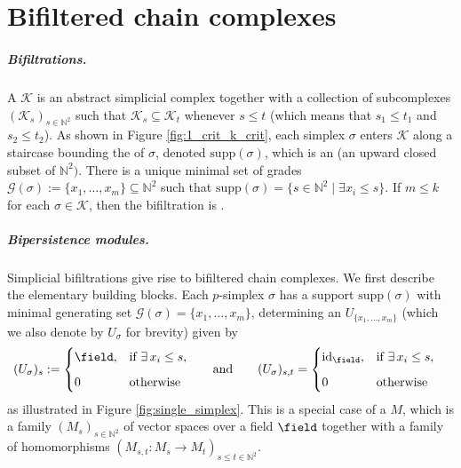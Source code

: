 \section{Bifiltered chain complexes}
\label{sec:Background}
%
\subparagraph{Bifiltrations.} A  $\mathcal{K}$ is an abstract simplicial complex together with a collection of subcomplexes $(\mathcal{K}_s)_{s\in \mathbb{N}^2}$ such that $\mathcal{K}_s\subseteq \mathcal{K}_t$ whenever $s\leq t$ (which means that $s_1\leq t_1$ and $s_2\leq t_2$).
As shown in Figure \ref{fig:1_crit_k_crit}, each simplex $\sigma$ enters $\mathcal{K}$ along a staircase bounding the  of $\sigma$, denoted $\mathrm{supp}(\sigma)$, which is an  (an upward closed subset of $\mathbb{N}^2)$.
There is a unique minimal set of grades
$\mathcal{G}(\sigma):=\{x_1,\dots,x_m\}\subseteq \mathbb{N}^2$ 
such that $\mathrm{supp}(\sigma)=\{ s\in \mathbb{N}^2\mid \exists x_i\leq s\}$.
If $m\leq k$ for each $\sigma \in \mathcal{K}$, then the bifiltration is . 
%
%
\subparagraph{Bipersistence modules.}
%
Simplicial bifiltrations give rise to bifiltered chain complexes. 
We first describe the elementary building blocks.
Each $p$-simplex $\sigma$ has a support $\mathrm{supp}(\sigma)$ with minimal generating set $\mathcal{G}(\sigma)=\{x_1,\dots,x_m\}$,
determining an  $U_{\{x_1,\dots,x_m\}}$ (which we also denote by $U_\sigma$ for brevity) given by 
\begin{equation*}
\begin{aligned}
(U_\sigma)_s &:= 
\begin{cases}
\field, & \text{if } \exists\, x_i \leq s, \\[6pt]
0 & \text{otherwise}
\end{cases}
&
\quad \text{and}\qquad
(U_\sigma)_{s, t} &= 
\begin{cases}
\mathrm{id}_\field, & \text{if } \exists\, x_i \leq s, \\[6pt]
0 & \text{otherwise}
\end{cases}
\end{aligned}
\end{equation*}
as illustrated in Figure \ref{fig:single_simplex}.
%
This is a special case of a  $M$, which is a family $(M_s)_{s\in\mathbb{N}^2}$ of vector spaces over a field $\field$ together with a family of homomorphisms $(M_{s,t}\colon M_s \rightarrow M_t)_{s\leq t\in \mathbb{N}^2}$.
